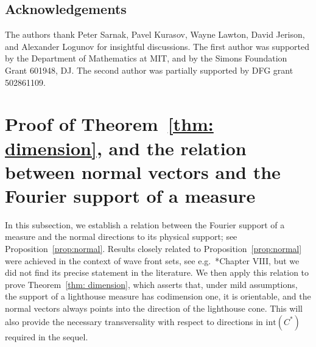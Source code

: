 \documentclass[11pt,letterpaper]{amsart}
\theoremstyle{definition}
\theoremstyle{plain}
\begin{document}
\subsection*{Acknowledgements}
The authors  thank Peter Sarnak, Pavel Kurasov, Wayne Lawton, David Jerison, and Alexander Logunov for insightful discussions. 
The first author was supported by the Department of Mathematics at MIT, and by the Simons Foundation Grant 601948, DJ. The second author was partially supported by DFG grant 502861109.

\section{Proof of Theorem~\ref{thm: dimension}\label{sec:three}, and the relation between normal vectors and the Fourier support of a measure}
In this subsection, we establish a relation between the Fourier support of a measure and the normal directions to its physical support; see Proposition~\ref{prop:normal}. Results closely related to Proposition~\ref{prop:normal} were achieved in the context of wave front sets, see e.g.~\cite{hormander}*{Chapter VIII}, but we did not find its precise statement in the literature.
We then apply this relation to prove Theorem~\ref{thm: dimension}, which asserts that, under mild assumptions, the support of a lighthouse measure has codimension one, it is orientable, and the normal vectors always points into the direction of the lighthouse cone. This will also provide the necessary transversality with respect to directions in $\mathrm{int}(C^{*})$ required in the sequel.
 
\end{document}
